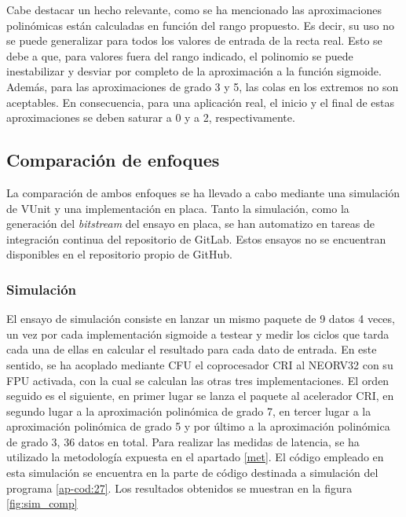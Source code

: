 Cabe destacar un hecho relevante, como se ha mencionado las aproximaciones polinómicas están calculadas en función del rango propuesto.
Es decir, su uso no se puede generalizar para todos los valores de entrada de la recta real.
Esto se debe a que, para valores fuera del rango indicado, el polinomio se puede inestabilizar y desviar por completo de la aproximación a la función sigmoide.
Además, para las aproximaciones de grado 3 y 5, las colas en los extremos no son aceptables.
En consecuencia, para una aplicación real, el inicio y el final de estas aproximaciones se deben saturar a 0 y a 2, respectivamente.

\subsection{Comparación de enfoques}

La comparación de ambos enfoques se ha llevado a cabo mediante una simulación de VUnit  y una implementación en placa.
Tanto la simulación, como la generación del \textit{bitstream} del ensayo en placa, se han automatizo en tareas de integración continua del repositorio de GitLab.
Estos ensayos no se encuentran disponibles en el repositorio propio de GitHub.

\subsubsection{Simulación}

El ensayo de simulación consiste en lanzar un mismo paquete de 9 datos 4 veces, un vez por cada implementación sigmoide a testear y medir los ciclos que tarda cada una de ellas en calcular el resultado para cada dato de entrada.
En este sentido, se ha acoplado mediante CFU el coprocesador CRI al NEORV32 con su FPU activada, con la cual se calculan las otras tres implementaciones.
El orden seguido es el siguiente, en primer lugar se lanza el paquete al acelerador CRI, en segundo lugar a la aproximación polinómica de grado 7, en tercer lugar a la aproximación polinómica de grado 5 y por último a la aproximación polinómica de grado 3, 36 datos en total.
Para realizar las medidas de latencia, se ha utilizado la metodología expuesta en el apartado \ref{met}.
El código empleado en esta simulación se encuentra en la parte de código destinada a simulación del programa \ref{ap-cod:27}.
Los resultados obtenidos se muestran en la figura \ref{fig:sim_comp}

